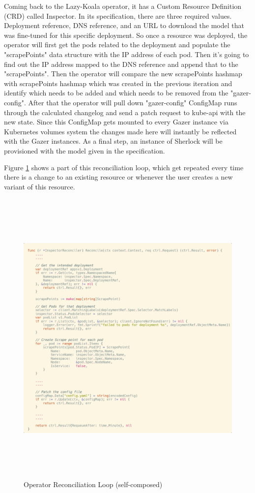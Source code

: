 Coming back to the Lazy-Koala operator, it has a Custom Resource Definition (CRD) called Inspector. In its specification, there are three required values. Deployment reference, DNS reference, and an URL to download the model that was fine-tuned for this specific deployment. So once a resource was deployed, the operator will first get the pods related to the deployment and populate the "scrapePoints" data structure with the IP address of each pod. Then it's going to find out the IP address mapped to the DNS reference and append that to the "scrapePoints". Then the operator will compare the new scrapePoints hashmap with scrapePoints hashmap which was created in the previous iteration and identify which needs to be added and which needs to be removed from the "gazer-config". After that the operator will pull down "gazer-config" ConfigMap runs through the calculated changelog and send a patch request to kube-api with the new state. Since this ConfigMap gets mounted to every Gazer instance via Kubernetes volumes system the changes made here will instantly be reflected with the Gazer instances. As a final step, an instance of Sherlock will be provisioned with the model given in the specification.

Figure \ref{fig:reconcile-loop} shows a part of this reconciliation loop, which get repeated every time there is a change to an existing resource or whenever the user creates a new variant of this resource.

\begin{figure}[H]
    \includegraphics[height=15cm]{assets/implementation/reconcile-loop.png}
    \caption{Operator Reconciliation Loop (self-composed)}
    \label{fig:reconcile-loop}
\end{figure}




